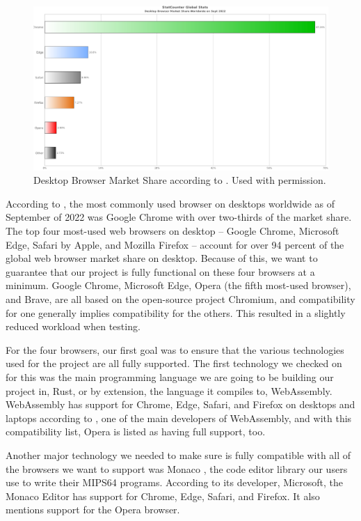 \documentclass[
    paper=letter,
    parskip=half,
    fontsize=12pt,
    titlepage=firstiscover,
    toc=bibliography,
    numbers=endperiod
]{scrartcl}
\begin{document}
\begin{figure}[H]
    \includegraphics[width=\textwidth]{browser-global-stats}
    \caption{Desktop Browser Market Share according to \protect\cite{statcounter}. Used with
        permission.}
\end{figure}

According to \cite{statcounter}, the most commonly used browser on
desktops worldwide as of September of 2022 was Google Chrome with over
two-thirds of the market share. The top four most-used web browsers on
desktop -- Google Chrome, Microsoft Edge, Safari by Apple, and Mozilla
Firefox -- account for over 94 percent of the global web browser market
share on desktop. Because of this, we want to guarantee that our project
is fully functional on these four browsers at a minimum. Google Chrome,
Microsoft Edge, Opera (the fifth most-used browser), and Brave, are all
based on the open-source project Chromium, and compatibility for one
generally implies compatibility for the others. This resulted in a
slightly reduced workload when testing.

For the four browsers, our first goal was to ensure that the various
technologies used for the project are all fully supported. The first
technology we checked on for this was the main programming language we
are going to be building our project in, Rust, or by extension, the
language it compiles to, WebAssembly. WebAssembly has support for
Chrome, Edge, Safari, and Firefox on desktops and laptops according to
\cite{mdn-webassembly}, one of the main developers of WebAssembly, and
with this compatibility list, Opera is listed as having full support,
too.

Another major technology we needed to make sure is fully compatible with
all of the browsers we want to support was Monaco \cite{monaco}, the
code editor library our users use to write their MIPS64 programs.
According to its developer, Microsoft, the Monaco Editor has support for
Chrome, Edge, Safari, and Firefox. It also mentions support for the
Opera browser.
\end{document}

